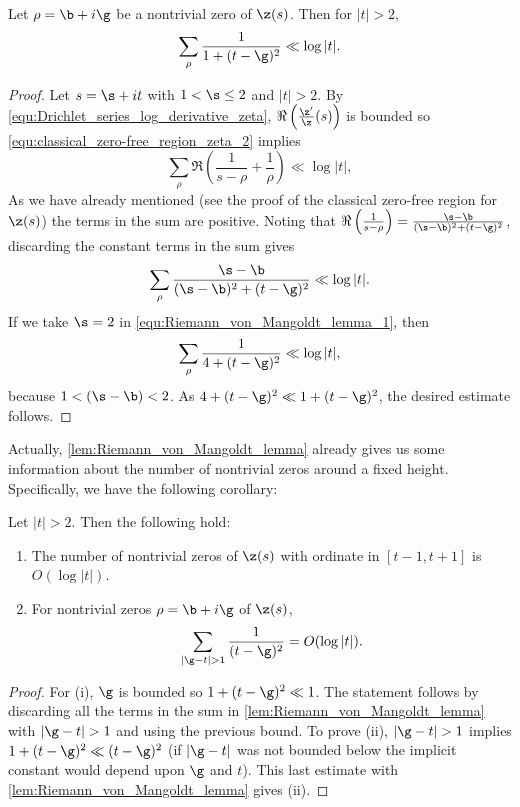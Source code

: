       \begin{lemma}\label{lem:Riemann_von_Mangoldt_lemma}
        Let $\rho = \b+i\g$ be a nontrivial zero of $\z(s)$. Then for $|t| > 2$,
        \[
          \sum_{\rho}\frac{1}{1+(t-\g)^{2}} \ll \log|t|.
        \]
      \end{lemma}
      \begin{proof}
        Let $s = \s+it$ with $1 < \s \le 2$ and $|t| > 2$. By \cref{equ:Drichlet_series_log_derivative_zeta}, $\Re\left(\frac{\z'}{\z}(s)\right)$ is bounded so \cref{equ:classical_zero-free_region_zeta_2} implies
        \[
          \sum_{\rho}\Re\left(\frac{1}{s-\rho}+\frac{1}{\rho}\right) \ll \log|t|,
        \]
        As we have already mentioned (see the proof of the classical zero-free region for $\z(s)$) the terms in the sum are positive. Noting that $\Re\left(\frac{1}{s-\rho}\right) = \frac{\s-\b}{(\s-\b)^{2}+(t-\g)^{2}}$, discarding the constant terms in the sum gives
        \begin{equation}\label{equ:Riemann_von_Mangoldt_lemma_1}
          \sum_{\rho}\frac{\s-\b}{(\s-\b)^{2}+(t-\g)^{2}} \ll \log|t|.
        \end{equation}
        If we take $\s = 2$ in \cref{equ:Riemann_von_Mangoldt_lemma_1}, then
        \[
          \sum_{\rho}\frac{1}{4+(t-\g)^{2}} \ll \log|t|,
        \]
        because $1 < (\s-\b) < 2$. As $4+(t-\g)^{2} \ll 1+(t-\g)^{2}$, the desired estimate follows.
      \end{proof}

      Actually, \cref{lem:Riemann_von_Mangoldt_lemma} already gives us some information about the number of nontrivial zeros around a fixed height. Specifically, we have the following corollary:

      \begin{corollary}\label{cor:Riemann_von_Mangoldt_corollary}
        Let $|t| > 2$. Then the following hold:
        \begin{enumerate}[label=(\roman*)]
          \item The number of nontrivial zeros of $\z(s)$ with ordinate in $[t-1,t+1]$ is $O(\log|t|)$.
          \item For nontrivial zeros $\rho = \b+i\g$ of $\z(s)$,
          \[
            \sum_{|\g-t| > 1}\frac{1}{(t-\g)^{2}} = O(\log|t|).
          \]
        \end{enumerate}
      \end{corollary}
      \begin{proof}
        For (i), $\g$ is bounded so $1+(t-\g)^{2} \ll 1$. The statement follows by discarding all the terms in the sum in \cref{lem:Riemann_von_Mangoldt_lemma} with $|\g-t| > 1$ and using the previous bound. To prove (ii), $|\g-t| > 1$ implies $1+(t-\g)^{2} \ll (t-\g)^{2}$ (if $|\g-t|$ was not bounded below the implicit constant would depend upon $\g$ and $t$). This last estimate with \cref{lem:Riemann_von_Mangoldt_lemma} gives (ii).
      \end{proof}

